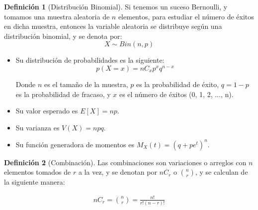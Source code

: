 \documentclass{article}
\theoremstyle{definition}
\newtheorem{definition}{Definición}[section]
\theoremstyle{plain}
\theoremstyle{remark}
\begin{document}
\begin{definition}[Distribución Binomial]
Si tenemos un suceso Bernoulli, y tomamos una muestra aleatoria de $n$ elementos, para estudiar el número de éxitos en dicha muestra, entonces la variable aleatoria se distribuye según una distribución binomial, y se denota por:
\[
X \sim Bin(n, p)
\]

\begin{itemize}
  \item Su distribución de probabilidades es la siguiente:
\[
p(X = x) = n C_x p^x q^{n-x}
\]

Donde $n$ es el tamaño de la muestra, $p$ es la probabilidad de éxito, $q = 1 - p$ es la probabilidad de fracaso, y $x$ es el número de éxitos (0, 1, 2, ..., n).

\item Su valor esperado es $E[X] = np$.
\item Su varianza es $V(X) = npq$.
\item Su función generadora de momentos es $M_X(t) = (q + pe^{t})^n$.
\end{itemize}

\end{definition}

\begin{definition}[Combinación]
Las combinaciones son variaciones o arreglos con $n$ elementos tomados de $r$ a la vez, y se denotan por $n C_r$ o $\binom{n}{r}$, y se calculan de la siguiente manera:

\begin{align*}
n C_r = \binom{n}{r} = \frac{n!}{r! (n-r)!}
\end{align*}

\end{definition}
\end{document}
